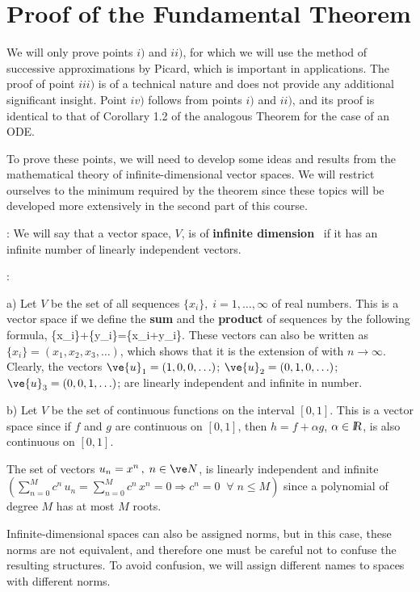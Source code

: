 \chapter{Proof of the Fundamental Theorem}

We will only prove points $i)$ and $ii)$, for which we will use the
method of successive approximations by Picard, which is important in applications. The proof of point $iii)$ is of a technical nature and does not provide any additional significant insight. Point $iv)$ follows from points $i)$ and $ii)$, and its proof is identical to that of Corollary 1.2 of the analogous Theorem for the case of an ODE.

To prove these points, we will need to develop some ideas and results from the mathematical theory of infinite-dimensional vector spaces. We will restrict ourselves to the minimum required by the theorem since these topics will be developed more extensively in the second part of this course.

\espa
{}: 
We will say that a vector space, $V$, is of
{\bf infinite dimension}~ if it has an infinite number 
of linearly independent vectors.

\noi 
{}:

\noi
a) Let $V$ be the set of all sequences
$\{x_i\},\;i=1,\ldots,\infty$ of real numbers. This is a vector
space if we define the {\bf sum} and the {\bf product} of sequences by 
the following formula,
\beq
\{x_i\}+\alpha\{y_i\}=\{x_i+\alpha\:y_i\}.
\eeq
These vectors can also be written as
$\{x_i\}=(x_1,x_2,x_3,\ldots )$, which shows that it is the
extension of \ren with $n\to\infty$.
Clearly, the vectors $\ve{u}_1=(1,0,0,\ldots) $; $\ve{u}_2=(0,1,0,\ldots) $;
$\ve{u}_3=(0,0,1,\ldots) $; are linearly independent and infinite in number.

\espa

\noi 
b) Let $V$ be the set of continuous functions on the interval
$[0,1]$. This is a vector space since if $f$ and $g$ are
continuous on $[0,1]$, then $h=f+\alpha g$, $\alpha \in \mbox{\sl {l$\!\!\!\;\:\!$R}}$, 
is also continuous on $[0,1]$.

The set of vectors $u_n=x^n\,,\;n\in{\ve N}$, is linearly
independent and infinite
$(\sum^M_{n=0}c^n\,u_n=\sum_{n=0}^Mc^n\,x^n=0\Longrightarrow
c^n=0\;\;\forall \;n\leq  M)$ since a polynomial of degree
$M$ has at most $M$ roots.

Infinite-dimensional spaces can also be assigned
norms, but in this case, these norms are not equivalent, and therefore
one must be careful not to confuse the resulting structures.
To avoid confusion, we will assign different names to spaces with different norms.

